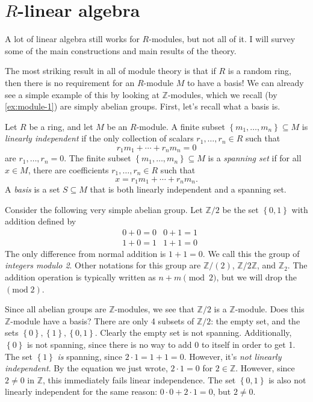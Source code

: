 \section{$R$-linear algebra}

A lot of linear algebra still works for $R$-modules, but not all of it. I will survey some of the main constructions and main results of the theory.

The most striking result in all of module theory is that if $R$ is a random ring, then there is no requirement for an $R$-module $M$ to have a basis! We can already see a simple example of this by looking at $\mathbb{Z} $-modules, which we recall (by \cref{ex:module-1}) are simply abelian groups. First, let's recall what a basis is.

\begin{definition}\label{dfn:basis}
	Let $R$ be a ring, and let $M$ be an $R$-module. A finite subset $\left\{ m_1, \ldots ,m_n \right\} \subseteq M$ is \emph{linearly independent} if the only collection of scalars $r_1, \ldots ,r_n\in R$ such that
	\[
		r_1m_1+ \cdots + r_nm_n = 0
	\]
	are $r_1, \ldots , r_n = 0$. The finite subset $\left\{ m_1, \ldots ,m_n \right\} \subseteq M$ is a \emph{spanning set} if for all $x\in M$, there are coefficients $r_1, \ldots , r_n\in R$ such that
	\[
		x = r_1m_1 + \cdots + r_nm_n
	.\]
	A \emph{basis} is a set $S\subseteq M$ that is both linearly independent and a spanning set.
\end{definition}

Consider the following very simple abelian group. Let $\mathbb{Z} /2$ be the set $\left\{ 0,1 \right\} $ with addition defined by
\begin{align*}
	&0+0=0&0+1=1 \\
	&1+0=1&1+1=0
\end{align*}
The only difference from normal addition is $1+1=0$. We call this the group of \emph{integers modulo 2}. Other notations for this group are $\mathbb{Z} /(2)$, $\mathbb{Z} /2\mathbb{Z} $, and $\mathbb{Z}_2$. The addition operation is typically written as $n+m\pmod{2}$, but we will drop the $(\text{mod}\;2)$.

Since all abelian groups are $\mathbb{Z} $-modules, we see that $\mathbb{Z} /2$ is a $\mathbb{Z} $-module. Does this $\mathbb{Z} $-module have a basis? There are only 4 subsets of $\mathbb{Z} /2$: the empty set, and the sets $\left\{ 0\right\} ,\left\{ 1 \right\} ,\left\{ 0,1 \right\} $. Clearly the empty set is not spanning. Additionally, $\left\{ 0 \right\} $ is not spanning, since there is no way to add 0 to itself in order to get 1. The set $\left\{ 1 \right\}$ \emph{is} spanning, since $2\cdot 1 = 1+1 = 0$. However, it's \emph{not linearly independent}. By the equation we just wrote, $2\cdot 1=0$ for $2\in\mathbb{Z} $. However, since $2\neq 0$ in $\mathbb{Z} $, this immediately fails linear independence. The set $\left\{ 0,1 \right\} $ is also not linearly independent for the same reason: $0\cdot 0+2\cdot 1=0$, but $2\neq 0$.

